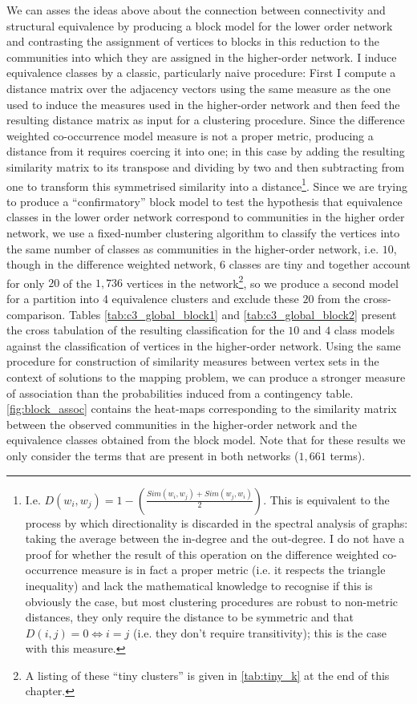 We can asses the ideas above about the connection between connectivity and structural equivalence by producing a block model for the lower order network and contrasting the assignment of vertices to blocks in this reduction to the communities into which they are assigned in the higher-order network.
I induce equivalence classes by a classic, particularly naive procedure: First I compute a distance matrix over the adjacency vectors using the same measure as the one used to induce the measures used in the higher-order network and then feed the resulting distance matrix as input for a clustering procedure.
Since the difference weighted co-occurrence model measure is not a proper metric, producing a distance from it requires coercing it into one; in this case by adding the resulting similarity matrix to its transpose and dividing by two and then subtracting from one to transform this symmetrised similarity into a distance\footnote{
    I.e. $D(w_i,w_j) = 1 - ( \frac{Sim(w_i,w_j) + Sim(w_j,w_i)}{2} )$.
    This is equivalent to the process by which directionality is discarded in the spectral analysis of graphs: taking the average between the in-degree and the out-degree.
    I do not have a proof for whether the result of this operation on the difference weighted co-occurrence measure is in fact a proper metric (i.e. it respects the triangle inequality) and lack the mathematical knowledge to recognise if this is obviously the case, but most clustering procedures are robust to non-metric distances, they only require the distance to be symmetric and that $D(i,j) = 0 \Leftrightarrow i = j$ (i.e. they don't require transitivity); this is the case with this measure.
}.
Since we are trying to produce a ``confirmatory'' block model to test the hypothesis that equivalence classes in the lower order network correspond to communities in the higher order network, we use a fixed-number clustering algorithm to classify the vertices into the same number of classes as communities in the higher-order network, i.e. $10$, though in the difference weighted network, $6$ classes are tiny and together account for only $20$ of the $1,736$ vertices in the network\footnote{
    A listing of these ``tiny clusters'' is given in \autoref{tab:tiny_k} at the end of this chapter.
}, so we produce a second model for a partition into 4 equivalence clusters and exclude these $20$ from the cross-comparison.
Tables \ref{tab:c3_global_block1} and \ref{tab:c3_global_block2} present the cross tabulation of the resulting classification for the $10$ and $4$ class models against the classification of vertices in the higher-order network.
Using the same procedure for construction of similarity measures between vertex sets in the context of solutions to the mapping problem, we can produce a stronger measure of association than the probabilities induced from a contingency table.
\autoref{fig:block_assoc} contains the heat-maps corresponding to the similarity matrix between the observed communities in the higher-order network and the equivalence classes obtained from the block model.
Note that for these results we only consider the terms that are present in both networks ($1,661$ terms).

